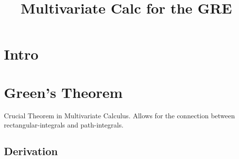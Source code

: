 \documentclass[11pt,twoside,a4paper]{article}
\begin{document}
\title{Multivariate Calc for the GRE}

\tableofcontents
\cleardoublepage

\section{Intro}
\label{intro}

\section{Green's Theorem}

Crucial Theorem in Multivariate Calculus. Allows for the connection between rectangular-integrals and path-integrals.

\subsection{Derivation}
\end{document}
